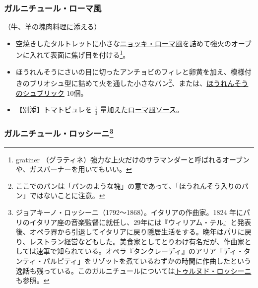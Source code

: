 \begin{recette}
\atoaki{}

\hypertarget{garniture-romaine}{%
\subsubsection{ガルニチュール・ローマ風}\label{garniture-romaine}}



（牛、羊の塊肉料理に添える）

\begin{itemize}
\item
  空焼きしたタルトレットに小さな\protect\hyperlink{gnokis-romaine}{ニョッキ・ローマ風}を詰めて強火のオーブンに入れて表面に焦げ目を付ける\footnote{gratiner
    （グラティネ）強力な上火だけのサラマンダーと呼ばれるオーブンや、ガスバーナーを用いてもいい。}。
\item
  ほうれんそうにさいの目に切ったアンチョビのフィレと卵黄を加え、模様付きのブリオシュ型に詰めて火を通した小さなパン\footnote{ここでのパンは「パンのような塊」の意であって、「ほうれんそう入りのパン」ではないことに注意。}、または、\protect\hyperlink{subric-d-epinards}{ほうれんそうのシュブリック}
  10個。
\item
  【別添】トマトピュレを \(\frac{1}{3}\)
  量加えた\protect\hyperlink{sauce-romaine}{ローマ風ソース}。
\end{itemize}

\atoaki{}

\hypertarget{garniture-rossini}{%
\subsubsection[ガルニチュール・ロッシーニ]{\texorpdfstring{ガルニチュール・ロッシーニ\footnote{ジョアキーノ・ロッシーニ（1792〜1868）。イタリアの作曲家。1824
  年にパリのイタリア座の音楽監督に就任し、29年には『ウィリアム・テル』と発表後、オペラ界から引退してイタリアに戻り隠居生活をする。晩年はパリに戻り、レストラン経営などもした。美食家としてとりわけ有名だが、作曲家としては速筆で知られている。オペラ『タンクレーディ』のアリア「ディ・タンティ・パルピティ」をリゾットを煮ているわずかの時間に作曲したという逸話も残っている。このガルニチュールについては\protect\hyperlink{tournedos-rossini}{トゥルヌド・ロッシーニ}も参照。}}{ガルニチュール・ロッシーニ}}\label{garniture-rossini}}


\end{recette}
